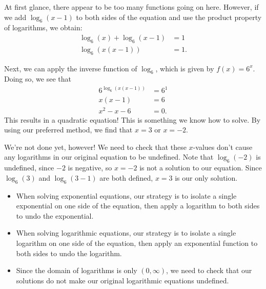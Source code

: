 \documentclass[nooutcomes]{ximera}
\begin{document}
\begin{explanation}
At first glance, there appear to be too many functions going on here. However, if we add $\log_6(x - 1)$ to both sides of the equation and use the product property of logarithms, we obtain:
\begin{align*}
\log_6(x) + \log_6(x - 1) & = 1 \\
\log_6(x(x - 1)) & = 1. 
\end{align*}

Next, we can apply the inverse function of $\log_6$, which is given by $f(x) = 6^x$. Doing so, we see that 
\begin{align*}
6^{\log_6(x(x - 1))} & = 6^1 \\
x(x - 1) & = 6 \\
x^2 - x - 6 & = 0.
\end{align*}
This results in a quadratic equation! This is something we know how to solve. By using our preferred method, we find that $x = 3$ or $x = -2$. 

We're not done yet, however! We need to check that these $x$-values don't cause any logarithms in our original equation to be undefined. Note that $\log_6(-2)$ is undefined, since $-2$ is negative, so $x = -2$ is not a solution to our equation. Since $\log_6(3)$ and $\log_6(3 - 1)$ are both defined, $x = 3$ is our only solution.
\end{explanation}

\begin{summary}

\begin{itemize}
\item When solving exponential equations, our strategy is to isolate a single exponential on one side of the equation, then apply a logarithm to both sides to undo the exponential. 

\item When solving logarithmic equations, our strategy is to isolate a single logarithm on one side of the equation, then apply an exponential function to both sides to undo the logarithm.

\item Since the domain of logarithms is only $(0, \infty)$, we need to check that our solutions do not make our original logarithmic equations undefined.  
\end{itemize}\end{summary}
\end{document}
